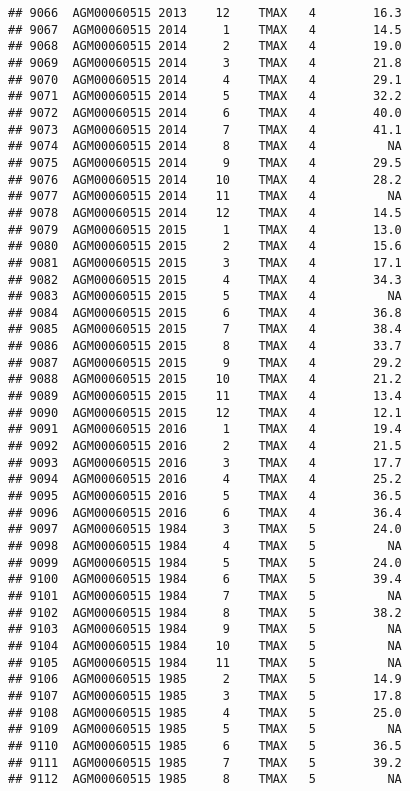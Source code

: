 \documentclass{article}\usepackage[]{graphicx}\usepackage[]{color}
\makeatletter
\newenvironment{kframe}{%
 \def\at@end@of@kframe{}%
 \ifinner\ifhmode%
  \def\at@end@of@kframe{\end{minipage}}%
  \begin{minipage}{\columnwidth}%
 \fi\fi%
 \def\FrameCommand##1{\hskip\@totalleftmargin \hskip-\fboxsep
 \colorbox{shadecolor}{##1}\hskip-\fboxsep
     \hskip-\linewidth \hskip-\@totalleftmargin \hskip\columnwidth}%
 \MakeFramed {\advance\hsize-\width
   \@totalleftmargin\z@ \linewidth\hsize
   \@setminipage}}%
 {\par\unskip\endMakeFramed%
 \at@end@of@kframe}
\newenvironment{knitrout}{}{} %
\makeatother
\begin{document}
\begin{knitrout}
\begin{kframe}
\begin{verbatim}
## 9066  AGM00060515 2013    12    TMAX   4        16.3
## 9067  AGM00060515 2014     1    TMAX   4        14.5
## 9068  AGM00060515 2014     2    TMAX   4        19.0
## 9069  AGM00060515 2014     3    TMAX   4        21.8
## 9070  AGM00060515 2014     4    TMAX   4        29.1
## 9071  AGM00060515 2014     5    TMAX   4        32.2
## 9072  AGM00060515 2014     6    TMAX   4        40.0
## 9073  AGM00060515 2014     7    TMAX   4        41.1
## 9074  AGM00060515 2014     8    TMAX   4          NA
## 9075  AGM00060515 2014     9    TMAX   4        29.5
## 9076  AGM00060515 2014    10    TMAX   4        28.2
## 9077  AGM00060515 2014    11    TMAX   4          NA
## 9078  AGM00060515 2014    12    TMAX   4        14.5
## 9079  AGM00060515 2015     1    TMAX   4        13.0
## 9080  AGM00060515 2015     2    TMAX   4        15.6
## 9081  AGM00060515 2015     3    TMAX   4        17.1
## 9082  AGM00060515 2015     4    TMAX   4        34.3
## 9083  AGM00060515 2015     5    TMAX   4          NA
## 9084  AGM00060515 2015     6    TMAX   4        36.8
## 9085  AGM00060515 2015     7    TMAX   4        38.4
## 9086  AGM00060515 2015     8    TMAX   4        33.7
## 9087  AGM00060515 2015     9    TMAX   4        29.2
## 9088  AGM00060515 2015    10    TMAX   4        21.2
## 9089  AGM00060515 2015    11    TMAX   4        13.4
## 9090  AGM00060515 2015    12    TMAX   4        12.1
## 9091  AGM00060515 2016     1    TMAX   4        19.4
## 9092  AGM00060515 2016     2    TMAX   4        21.5
## 9093  AGM00060515 2016     3    TMAX   4        17.7
## 9094  AGM00060515 2016     4    TMAX   4        25.2
## 9095  AGM00060515 2016     5    TMAX   4        36.5
## 9096  AGM00060515 2016     6    TMAX   4        36.4
## 9097  AGM00060515 1984     3    TMAX   5        24.0
## 9098  AGM00060515 1984     4    TMAX   5          NA
## 9099  AGM00060515 1984     5    TMAX   5        24.0
## 9100  AGM00060515 1984     6    TMAX   5        39.4
## 9101  AGM00060515 1984     7    TMAX   5          NA
## 9102  AGM00060515 1984     8    TMAX   5        38.2
## 9103  AGM00060515 1984     9    TMAX   5          NA
## 9104  AGM00060515 1984    10    TMAX   5          NA
## 9105  AGM00060515 1984    11    TMAX   5          NA
## 9106  AGM00060515 1985     2    TMAX   5        14.9
## 9107  AGM00060515 1985     3    TMAX   5        17.8
## 9108  AGM00060515 1985     4    TMAX   5        25.0
## 9109  AGM00060515 1985     5    TMAX   5          NA
## 9110  AGM00060515 1985     6    TMAX   5        36.5
## 9111  AGM00060515 1985     7    TMAX   5        39.2
## 9112  AGM00060515 1985     8    TMAX   5          NA

\end{verbatim}
\end{kframe}
\end{knitrout}
\end{document}
